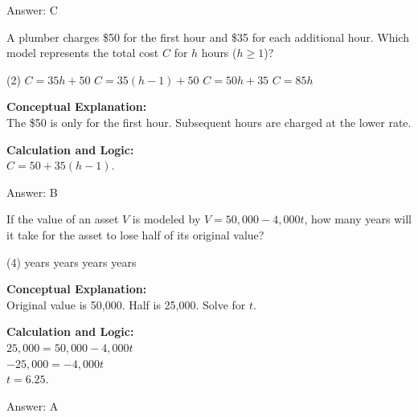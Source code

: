 \documentclass[11pt,paper=a4,answers]{exam}
\begin{document}
\begin{questions}
\begin{solution}
\vspace{15pt}
Answer: \colorbox{yellow!100}{C}
\end{solution}

\vspace{20pt}

\question
A plumber charges \$50 for the first hour and \$35 for each additional hour. Which model represents the total cost $C$ for $h$ hours ($h \ge 1$)?
\begin{tasks}(2)
    \task $C = 35h + 50$
    \task $C = 35(h - 1) + 50$
    \task $C = 50h + 35$
    \task $C = 85h$
\end{tasks}

\begin{solution}
\textbf{Conceptual Explanation:} \\
The \$50 is only for the first hour. Subsequent hours are charged at the lower rate.

\vspace{10pt}
\textbf{Calculation and Logic:} \\
$C = 50 + 35(h - 1)$.

\vspace{15pt}
Answer: \colorbox{yellow!100}{B}
\end{solution}

\vspace{20pt}

\question
If the value of an asset $V$ is modeled by $V = 50,000 - 4,000t$, how many years will it take for the asset to lose half of its original value?
\begin{tasks}(4)
     years
     years
     years
     years
\end{tasks}

\begin{solution}
\textbf{Conceptual Explanation:} \\
Original value is 50,000. Half is 25,000. Solve for $t$.

\vspace{10pt}
\textbf{Calculation and Logic:} \\
$25,000 = 50,000 - 4,000t$ \\
$-25,000 = -4,000t$ \\
$t = 6.25$.

\vspace{15pt}
Answer: \colorbox{yellow!100}{A}
\end{solution}


\end{questions}
\end{document}
